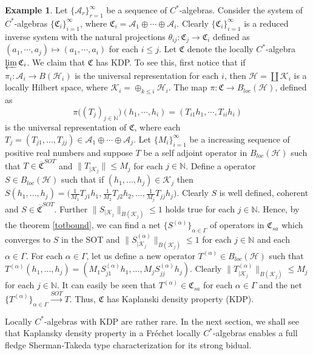 \documentclass[10pt]{article}
\theoremstyle{definition}
\newtheorem{example}{Example}[section]
\begin{document}
	\begin{example}
Let $\{\mathcal A_r\}_{r=1}^\infty$ be a sequence of $C^*$-algebras. Consider the system of $C^*$-algebras $\{\mathfrak C_i\}_{i=1}^\infty$, where $\mathfrak C_i=\mathcal A_1\oplus\cdots\oplus \mathcal A_i$. Clearly $\{\mathfrak C_i\}_{i=1}^\infty$ is a reduced inverse system with the natural projections $\theta_{ij}:\mathfrak C_j\to \mathfrak C_i$ defined as $(a_1,\cdots,a_j)\longmapsto (a_1,\cdots, a_i)$ for each $i\leq j$. Let $\mathfrak C$ denote the locally $C^*$-algebra $\varprojlim \mathfrak C_i$. We claim that $\mathfrak C$ has KDP. To see this, first notice that if $\pi_i:\mathcal A_i\to B(\mathcal H_i)$ is the universal representation for each $i$, then $\mathcal H=\coprod \mathcal K_i$ is a locally Hilbert space, where $\mathcal K_i=\oplus_{k\leq i}\mathcal H_i$. The map $\pi:\mathfrak C\to B_{loc}(\mathcal H)$, defined as $$\pi\bigl((T_j)_{j\in\mathbb N}\bigr)(h_1,\cdots, h_i)=(T_{i1}h_1,\cdots, T_{ii}h_i)$$ is the universal representation of $\mathfrak C$, where each $T_j=(T_{j1},...,T_{jj})\in \mathcal A_1\oplus\cdots\oplus \mathcal A_j$. Let $\{M_i\}_{i=1}^\infty$ be a increasing sequence of positive real numbers and suppose $T$ be a self adjoint operator in $B_{loc}(\mathcal H)$ such that $T\in \overline{\mathfrak C}^{SOT}$ and $\|T_{|\mathcal K_j}\|\leq M_j$ for each $j\in \mathbb N$. Define a operator $S\in B_{loc}(\mathcal H)$ such that if $(h_1,...,h_j)\in \mathcal K_j$ then  $S(h_1,...,h_j)=\bigl(\frac{1}{M_1}T_{j1}h_1,\frac{1}{M_2}T_{j2}h_2,...,\frac{1}{M_j}T_{jj}h_j\bigr)$. Clearly $S$ is well defined, coherent and $S\in \overline{\mathfrak C}^{SOT}$. Further $\|S_{|\mathcal K_j}\|_{B(\mathcal K_j)}\leq 1$ holds true for each $j\in \mathbb N$. Hence, by the theorem \ref{totbound}, we can find a net $\{S^{(\alpha)}\}_{\alpha\in \Gamma}$ of operators in $\mathfrak C_{sa}$ which converges to $S$ in the SOT and $\|S^{(\alpha)}_{|\mathcal K_j}\|_{B(\mathcal K_j)}\leq 1$ for each $j\in \mathbb N$ and each $\alpha\in \Gamma$. For each $\alpha\in \Gamma$, let us define a new operator $T^{(\alpha)}\in B_{loc}(\mathcal H)$ such that $T^{(\alpha)}(h_1,...,h_j)=(M_1S^{(\alpha)}_{j1}h_1, ..., M_jS^{(\alpha)}_{jj}h_j)$. Clearly $\|T^{(\alpha)}_{|\mathcal K_j}\|_{B(\mathcal K_j)}\leq M_j$ for each $j\in \mathbb N$. It can easily be seen that $T^{(\alpha)}\in \mathfrak C_{sa}$ for each $\alpha\in \Gamma$ and the net $\{T^{(\alpha)}\}_{\alpha\in \Gamma}\overset{SOT}{\longrightarrow} T$. Thus, $\mathfrak C$ has Kaplanski density property (KDP).
	\end{example}
	Locally $C^*$-algebras with KDP are rather rare. In the next section, we shall see that Kaplansky density property in a Fr\'echet locally $C^*$-algebras enables a full fledge Sherman-Takeda type  characterization for its strong bidual.
\end{document}
